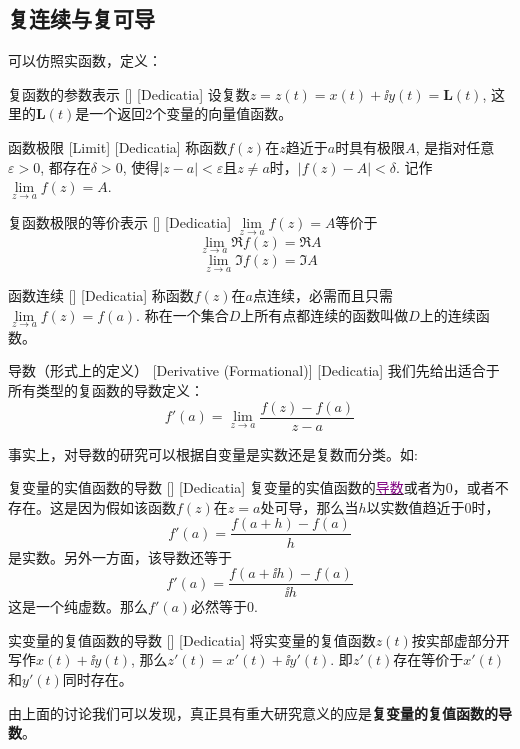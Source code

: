\documentclass[UTF8]{ctexart}
\newcommand{\hyperrefc}[2]{\hyperref[#1]{\textcolor{purple}{#2}}}
\begin{document}
\subsection{复连续与复可导}
可以仿照实函数，定义：
\begin{dfn}
    [UUID]
    {复函数的参数表示}
    []
    [Dedicatia]
    设复数$z=z(t)=x(t)+\ii y(t)=\bm{L}(t)$, 这里的$\bm{L}(t)$是一个返回2个变量的向量值函数。
\end{dfn}
\begin{dfn}
    [UUID]
    {函数极限}
    [Limit]
    [Dedicatia]
    称函数$f(z)$在$z$趋近于$a$时具有极限$A$, 是指对任意$\varepsilon>0$, 都存在$\delta>0$, 使得$|z-a|<\varepsilon$且$z\neq a$时，$|f(z)-A|<\delta$. 记作$\lim\limits_{z\to a}f(z)=A$.
\end{dfn}
\begin{ppt}
    [UUID]
    {复函数极限的等价表示}
    []
    [Dedicatia]
    $\lim\limits_{z\to a}f(z)=A$等价于
    \[\lim_{z\to a}\Re f(z)=\Re A\]
    \[\lim_{z\to a}\Im f(z)=\Im A\]
\end{ppt}
\begin{dfn}
    [UUID]
    {函数连续}
    []
    [Dedicatia]
    称函数$f(z)$在$a$点连续，必需而且只需$\lim\limits_{z\to a}f(z)=f(a)$. 称在一个集合$D$上所有点都连续的函数叫做$D$上的连续函数。
\end{dfn}
\begin{dfn}
    [Derivative]
    {导数（形式上的定义）}
    [Derivative (Formational)]
    [Dedicatia]
    我们先给出适合于所有类型的复函数的导数定义：
    \[f'(a)=\lim_{z\to a}\frac{f(z)-f(a)}{z-a}\]
\end{dfn}
事实上，对导数的研究可以根据自变量是实数还是复数而分类。如:
\begin{crl}
    [UUID]
    {复变量的实值函数的导数}
    []
    [Dedicatia]
    复变量的实值函数的\hyperrefc{dfn:Derivative}{导数}或者为0，或者不存在。这是因为假如该函数$f(z)$在$z=a$处可导，那么当$h$以实数值趋近于0时，
    \[f'(a)=\frac{f(a+h)-f(a)}{h}\]
    是实数。另外一方面，该导数还等于
    \[f'(a)=\frac{f(a+\ii h)-f(a)}{\ii h}\]
    这是一个纯虚数。那么$f'(a)$必然等于0.
\end{crl}
\begin{xmp}
    [UUID]
    {实变量的复值函数的导数}
    []
    [Dedicatia]
    将实变量的复值函数$z(t)$按实部虚部分开写作$x(t)+\ii y(t)$, 那么$z'(t)=x'(t)+\ii y'(t)$. 即$z'(t)$存在等价于$x'(t)$和$y'(t)$同时存在。
\end{xmp}
由上面的讨论我们可以发现，真正具有重大研究意义的应是\textbf{复变量的复值函数的导数}。
\end{document}
